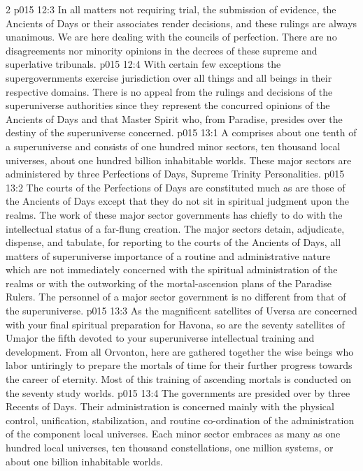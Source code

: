 \begin{multicols}{2}
\vs p015 12:3 In all matters not requiring trial, the submission of evidence, the Ancients of Days or their associates render decisions, and these rulings are always unanimous. We are here dealing with the councils of perfection. There are no disagreements nor minority opinions in the decrees of these supreme and superlative tribunals.
\vs p015 12:4 With certain few exceptions the supergovernments exercise jurisdiction over all things and all beings in their respective domains. There is no appeal from the rulings and decisions of the superuniverse authorities since they represent the concurred opinions of the Ancients of Days and that Master Spirit who, from Paradise, presides over the destiny of the superuniverse concerned.
\vs p015 13:1 A  comprises about one tenth of a superuniverse and consists of one hundred minor sectors, ten thousand local universes, about one hundred billion inhabitable worlds. These major sectors are administered by three Perfections of Days, Supreme Trinity Personalities.
\vs p015 13:2 The courts of the Perfections of Days are constituted much as are those of the Ancients of Days except that they do not sit in spiritual judgment upon the realms. The work of these major sector governments has chiefly to do with the intellectual status of a far\hyp{}flung creation. The major sectors detain, adjudicate, dispense, and tabulate, for reporting to the courts of the Ancients of Days, all matters of superuniverse importance of a routine and administrative nature which are not immediately concerned with the spiritual administration of the realms or with the outworking of the mortal\hyp{}ascension plans of the Paradise Rulers. The personnel of a major sector government is no different from that of the superuniverse.
\vs p015 13:3 As the magnificent satellites of Uversa are concerned with your final spiritual preparation for Havona, so are the seventy satellites of Umajor the fifth devoted to your superuniverse intellectual training and development. From all Orvonton, here are gathered together the wise beings who labor untiringly to prepare the mortals of time for their further progress towards the career of eternity. Most of this training of ascending mortals is conducted on the seventy study worlds.
\pc \vs p015 13:4 The  governments are presided over by three Recents of Days. Their administration is concerned mainly with the physical control, unification, stabilization, and routine co\hyp{}ordination of the administration of the component local universes. Each minor sector embraces as many as one hundred local universes, ten thousand constellations, one million systems, or about one billion inhabitable worlds.

\end{multicols}
